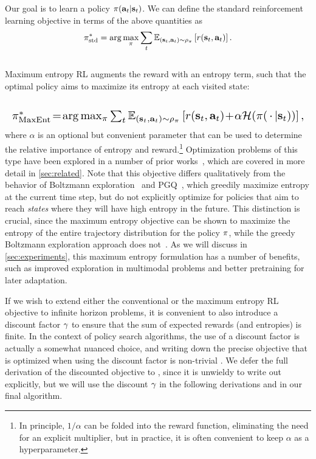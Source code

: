\documentclass{article}
\begin{document}
Our goal is to learn a policy $\pi({\mathbf{a}_t}|{\mathbf{s}_t})$. We can define the standard reinforcement learning objective in terms of the above quantities as
\vspace{-1mm}
\begin{equation}
\pi^*_\text{std} = \arg\max_{\pi} \sum_t \operatorname{\mathbb{E}}_{({\mathbf{s}_t}, {\mathbf{a}_t})\sim \rho_\pi}\left[r({\mathbf{s}_t},{\mathbf{a}_t})\right].
\end{equation}
\vspace{-3mm}\\
Maximum entropy RL augments the reward with an entropy term, such that the optimal policy aims to maximize its entropy at each visited state:
\vspace{-5mm}
\begin{align}
\label{eq:maxent_objective}\\
\resizebox{1.0\hsize}{!}{$\policy\opt_\text{MaxEnt} \!=\! \arg\max_{\policy} \sum_t \E{(\st, \at) \sim \rho_\policy}{\reward(\st,\at) \!+\! \alpha\ent(\policy(\sdots|\st))},$}\notag
\end{align}
\noindent where $\alpha$ is an optional but convenient parameter that can be used to determine the relative importance of entropy and reward.\footnote{In principle, $1/\alpha$ can be folded into the reward function, eliminating the need for an explicit multiplier, but in practice, it is often convenient to keep $\alpha$ as a hyperparameter.} Optimization problems of this type have been explored in a number of prior works~\cite{kappen2005path,todorov2006linearly,ziebart2008maximum}, which are covered in more detail in \autoref{sec:related}. Note that this objective differs qualitatively from the behavior of Boltzmann exploration~\cite{sallans2004reinforcement} and PGQ~\cite{o2016pgq}, which greedily maximize entropy at the current time step, but do not explicitly optimize for policies that aim to reach \emph{states} where they will have high entropy in the future. This distinction is crucial, since the maximum entropy objective can be shown to maximize the entropy of the entire trajectory distribution for the policy $\pi$, while the greedy Boltzmann exploration approach does not~\cite{ziebart2008maximum,levine2014learning}. As we will discuss in \autoref{sec:experiments}, this maximum entropy formulation has a number of benefits, such as improved exploration in multimodal problems and better pretraining for later adaptation.

If we wish to extend either the conventional or the maximum entropy RL objective to infinite horizon problems, it is convenient to also introduce a discount factor $\gamma$ to ensure that the sum of expected rewards (and entropies) is finite. In the context of policy search algorithms, the use of a discount factor is actually a somewhat nuanced choice, and writing down the precise objective that is optimized when using the discount factor is non-trivial \cite{thomas2014bias}. We defer the full derivation of the discounted objective to , since it is unwieldy to write out explicitly, but we will use the discount $\gamma$ in the following derivations and in our final algorithm.
\end{document}
